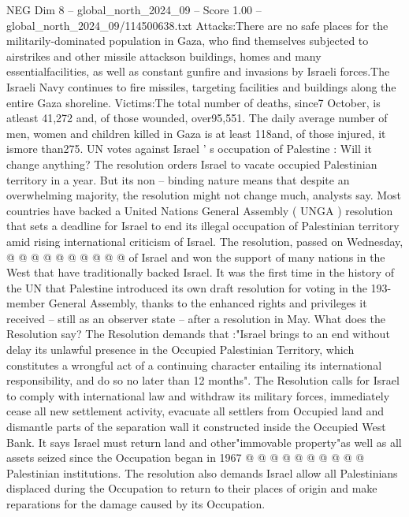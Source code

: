 \begin{textsample}{NEG Dim 8 – global\_north\_2024\_09 – Score 1.00 – global\_north\_2024\_09/114500638.txt}  \label{ex:f8_neg_378}
Attacks:There are no safe places for the militarily-dominated population in Gaza, who find themselves subjected to airstrikes and other missile attackson buildings, homes and many essentialfacilities, as well as constant gunfire and invasions by Israeli forces.The Israeli Navy continues to fire missiles, targeting facilities and buildings along the entire Gaza shoreline.
Victims:The total number of deaths, since7 October, is atleast 41,272 and, of those wounded, over95,551.
The daily average number of men, women and children killed in Gaza is at least 118and, of those injured, it ismore than275.
UN votes against Israel ' s occupation of Palestine : Will it change anything?
The resolution orders Israel to vacate occupied Palestinian territory in a year.
But its non -- binding nature means that despite an overwhelming majority, the resolution might not change much, analysts say.
Most countries have backed a United Nations General Assembly ( UNGA ) resolution that sets a deadline for Israel to end its illegal occupation of Palestinian territory amid rising international criticism of Israel.
The resolution, passed on Wednesday, @ @ @ @ @ @ @ @ @ @ of Israel and won the support of many nations in the West that have traditionally backed Israel.
It was the first time in the history of the UN that Palestine introduced its own draft resolution for voting in the 193-member General Assembly, thanks to the enhanced rights and privileges it received -- still as an observer state -- after a resolution in May.
What does the Resolution say?
The Resolution demands that :"Israel brings to an end without delay its unlawful presence in the Occupied Palestinian Territory, which constitutes a wrongful act of a continuing character entailing its international responsibility, and do so no later than 12 months".
The Resolution calls for Israel to comply with international law and withdraw its military forces, immediately cease all new settlement activity, evacuate all settlers from Occupied land and dismantle parts of the separation wall it constructed inside the Occupied West Bank.
It says Israel must return land and other"immovable property"as well as all assets seized since the Occupation began in 1967 @ @ @ @ @ @ @ @ @ @ Palestinian institutions.
The resolution also demands Israel allow all Palestinians displaced during the Occupation to return to their places of origin and make reparations for the damage caused by its Occupation.

\end{textsample}
